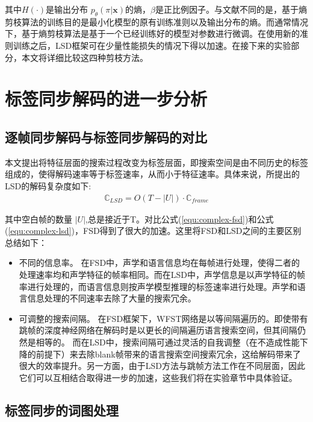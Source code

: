其中$H(\cdot)$是输出分布 $p_\theta (\pi|\mathbf{x})$的熵，$\beta$是正比例因子。与文献\cite{pereyra2017regularizing}不同的是，基于熵剪枝算法的训练目的是最小化模型的原有训练准则以及输出分布的熵。而通常情况下，基于熵剪枝算法是基于一个已经训练好的模型对参数进行微调。在使用新的准则训练之后，LSD框架可在少量性能损失的情况下得以加速。在接下来的实验部分，本文将详细比较这四种剪枝方法。


\section{标签同步解码的进一步分析}
\label{chap:lsd-lsd-more}

\subsection{逐帧同步解码与标签同步解码的对比}
\label{chap:lsd-lsd-cmp}

本文提出将特征层面的搜索过程改变为标签层面，即搜索空间是由不同历史的标签组成的，使得解码速率等于标签速率，从而小于特征速率。具体来说，所提出的LSD的解码复杂度如下:
  \begin{equation}
\label{equ:complex-lsd}
\begin{split}
\mathbb{C}_{LSD} = O (T-|U|) \cdot \mathbb{C}_{frame}
\end{split}
\end{equation}


其中空白帧的数量 $|U|$,总是接近于T。对比公式(\ref{equ:complex-fsd})和公式(\ref{equ:complex-lsd})，FSD得到了很大的加速。这里将FSD和LSD之间的主要区别总结如下：
\begin{itemize}
\item 不同的信息率。 在FSD中，声学和语言信息均在每帧进行处理，使得二者的处理速率均和声学特征的帧率相同。而在LSD中，声学信息是以声学特征的帧率进行处理的，而语言信息则按声学模型推理的标签速率进行处理。声学和语言信息处理的不同速率去除了大量的搜索冗余。
\item 可调整的搜索间隔。 在FSD框架下，WFST网络是以等间隔遍历的。即使带有跳帧的深度神经网络在解码\cite{vanhoucke2013multiframe}时是以更长的间隔遍历语言搜索空间，但其间隔仍然是相等的。 而在LSD中，搜索间隔可通过灵活的自我调整（在不造成性能下降的前提下）来去除blank帧带来的语言搜索空间搜索冗余，这给解码带来了很大的效率提升。另一方面，由于LSD方法与跳帧方法工作在不同层面，因此它们可以互相结合取得进一步的加速，这些我们将在实验章节中具体验证。
\end{itemize}

\subsection{标签同步的词图处理}
\label{chap:lsd-lsd-lattice}

